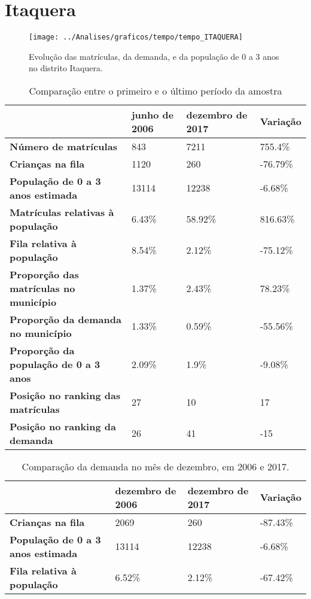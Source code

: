 \section{Itaquera}
\begin{figure}[H]
\centering
\texttt{[image: ../Analises/graficos/tempo/tempo\_ITAQUERA]}
\caption{Evolução das matrículas, da demanda, e da população de 0 a 3 anos no distrito Itaquera.}
\end{figure}
\begin{table}[H]
\begin{tabular}{|l|l|l|l|}
\hline
\textbf{}                                      & \textbf{junho de 2006}       & \textbf{dezembro de 2017}    & \textbf{Variação} \\ \hline
\textbf{Número de matrículas}                  & 843 & 7211 & 755.4\% \\ \hline
\textbf{Crianças na fila}                      & 1120 & 260 & -76.79\% \\ \hline
\textbf{População de 0 a 3 anos estimada}      & 13114 & 12238 & -6.68\% \\ \hline
\textbf{Matrículas relativas à população}      & 6.43\% & 58.92\% & 816.63\% \\ \hline
\textbf{Fila relativa à população}             & 8.54\% & 2.12\% & -75.12\% \\ \hline
\textbf{Proporção das matrículas no município} & 1.37\% & 2.43\% & 78.23\% \\ \hline
\textbf{Proporção da demanda no município}     & 1.33\% & 0.59\% & -55.56\% \\ \hline
\textbf{Proporção da população de 0 a 3 anos}  & 2.09\% & 1.9\% & -9.08\% \\ \hline
\textbf{Posição no ranking das matrículas}     & 27 & 10 & 17 \\ \hline
\textbf{Posição no ranking da demanda}         & 26 & 41 & -15 \\ \hline
\end{tabular}
\caption{Comparação entre o primeiro e o último período da amostra}
\end{table}
\begin{table}[H]
\begin{tabular}{|l|l|l|l|}
\hline
\textbf{}                                 & \textbf{dezembro de 2006} & \textbf{dezembro de 2017} & \textbf{Variação} \\ \hline
\textbf{Crianças na fila}                      & 2069 & 260 & -87.43\% \\ \hline
\textbf{População de 0 a 3 anos estimada}      & 13114 & 12238 & -6.68\% \\ \hline
\textbf{Fila relativa à população}             & 6.52\% & 2.12\% & -67.42\% \\ \hline
\end{tabular}
\caption{Comparação da demanda no mês de dezembro, em 2006 e 2017.}
\end{table}
